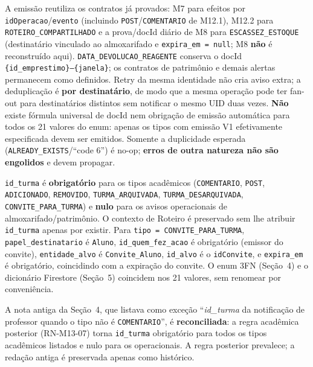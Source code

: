 \begin{regra}
A emissão reutiliza os contratos já provados: M7 para efeitos por
\texttt{idOperacao}/\texttt{evento} (incluindo \texttt{POST}/\texttt{COMENTARIO}
de M12.1), M12.2 para \texttt{ROTEIRO\_COMPARTILHADO} e a prova/docId diário de
M8 para \texttt{ESCASSEZ\_ESTOQUE} (destinatário vinculado ao almoxarifado e
\texttt{expira\_em = null}; M8 \textbf{não} é reconstruído aqui).
\texttt{DATA\_DEVOLUCAO\_REAGENTE} conserva o docId
\texttt{\{id\_emprestimo\}--\{janela\}}; os contratos de patrimônio e demais
alertas permanecem como definidos. Retry da mesma identidade não cria aviso
extra; a deduplicação é \textbf{por destinatário}, de modo que a mesma operação
pode ter fan-out para destinatários distintos sem notificar o mesmo UID duas
vezes. \textbf{Não} existe fórmula universal de docId nem obrigação de emissão
automática para todos os 21 valores do enum: apenas os tipos com emissão V1
efetivamente especificada devem ser emitidos. Somente a duplicidade esperada
(\texttt{ALREADY\_EXISTS}/``code 6'') é no-op; \textbf{erros de outra natureza
não são engolidos} e devem propagar.
\end{regra}

\begin{regra}
\texttt{id\_turma} é \textbf{obrigatório} para os tipos acadêmicos
(\texttt{COMENTARIO}, \texttt{POST}, \texttt{ADICIONADO}, \texttt{REMOVIDO},
\texttt{TURMA\_ARQUIVADA}, \texttt{TURMA\_DESARQUIVADA}, \texttt{CONVITE\_PARA\_TURMA}) e \textbf{nulo} para os
avisos operacionais de almoxarifado/patrimônio. O contexto de Roteiro é
preservado sem lhe atribuir \texttt{id\_turma} apenas por existir. Para \texttt{tipo = CONVITE\_PARA\_TURMA}, \texttt{papel\_destinatario} é \texttt{Aluno}, \texttt{id\_quem\_fez\_acao} é obrigatório (emissor do convite), \texttt{entidade\_alvo} é \texttt{Convite\_Aluno}, \texttt{id\_alvo} é o \texttt{idConvite}, e \texttt{expira\_em} é obrigatório, coincidindo com a expiração do convite. O enum 3FN
(Seção~4) e o dicionário Firestore (Seção~5) coincidem nos 21 valores, sem
renomear por conveniência.
\end{regra}

\begin{explicacao}
A nota antiga da Seção~4, que listava como exceção ``\textit{id\_turma} da
notificação de professor quando o tipo não é \texttt{COMENTARIO}'', é
\textbf{reconciliada}: a regra acadêmica posterior (RN-M13-07) torna
\texttt{id\_turma} obrigatório para todos os tipos acadêmicos listados e nulo
para os operacionais. A regra posterior prevalece; a redação antiga é preservada
apenas como histórico.
\end{explicacao}

